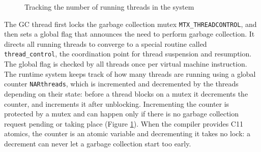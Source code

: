 \begin{figure}[h]
\begin{center}
\end{center}
\caption{\label{trackThreads}Tracking the number of running threads in the system}
\end{figure}

\label{GC-Mutex}
The GC thread first locks the garbage collection mutex
\texttt{MTX\_THREADCONTROL}, and then sets a global flag that announces the
need to perform garbage collection. It directs all running threads to
converge to a special routine called \texttt{thread\_control}, the
coordination point for thread suspension and resumption. The global flag is
checked by all threads once per virtual machine instruction.  The runtime
system keeps track of how many threads are running using a global counter
\texttt{NARthreads}, which is incremented and decremented by the threads
depending on their state: before a thread blocks on a mutex it decrements
the counter, and increments it after unblocking. Incrementing the counter
is protected by a mutex and can happen only if there is no garbage
collection request pending or taking place (Figure \ref{trackThreads}).
When the compiler provides C11 atomics, the counter is an atomic variable
and decrementing it takes no lock: a decrement can never let a garbage
collection start too early.

